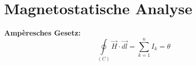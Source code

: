 \section{Magnetostatische Analyse}
\textbf{Ampèresches Gesetz:} \\
\[ \oint\limits_{(C)}\vec{H}\cdot\vec{dl} = \sum\limits_{k = 1}^{n} I_k = \theta \]
\clearpage
\pagebreak